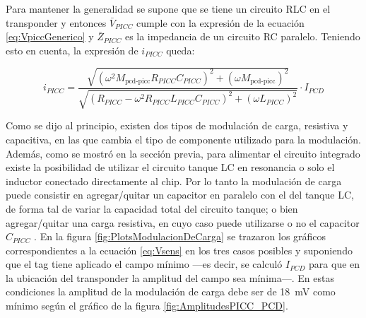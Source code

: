 Para mantener la generalidad se supone que se tiene un circuito RLC en el 
transponder y entonces \(\bar{V}_{PICC}\) cumple con la expresión de la 
ecuación \eqref{eq:VpiccGenerico} y \(\bar{Z}_{PICC}\) es la impedancia de 
un circuito RC paralelo. Teniendo esto en cuenta, la expresión de \(i_{PICC}
\) queda:

\begin{equation}
	i_{PICC} = \frac{\sqrt{\left(\omega^2 M_{\text{pcd-picc}} R_{PICC} 
	C_{PICC}\right)^2 + \left(\omega M_{\text{pcd-picc}}\right)^2}}{\sqrt{\left(R_{PICC}-\omega^2 R_{PICC} L_{PICC} C_{PICC}\right)^2 + \left(\omega L_{PICC}\right)^2}} \cdot I_{PCD}
\end{equation}

Como se dijo al principio, existen dos tipos de modulación de carga, 
resistiva y capacitiva, en las que cambia el tipo de componente utilizado 
para la modulación. Además, como se mostró en la sección previa, para 
alimentar el circuito integrado existe la posibilidad de utilizar el 
circuito tanque LC en resonancia o solo el inductor conectado directamente 
al chip. Por lo tanto la modulación de carga puede consistir en 
agregar/quitar un capacitor en paralelo con el del tanque LC, de forma tal 
de variar la capacidad total del circuito tanque; o bien agregar/quitar una 
carga resistiva, en cuyo caso puede utilizarse o no el capacitor \(C_{PICC}\)
. En la figura \ref{fig:PlotsModulacionDeCarga} se trazaron los gráficos 
correspondientes a la ecuación \eqref{eq:Vsens} en los tres casos posibles y 
suponiendo que el tag tiene aplicado el campo mínimo ---es decir, se calculó 
\(I_{PCD}\) para que en la ubicación del transponder la amplitud del campo 
sea mínima---. En estas condiciones la amplitud de la modulación de carga 
debe ser de \SI{18}{\milli\volt} como mínimo según el gráfico de la figura 
\ref{fig:AmplitudesPICC_PCD}.

